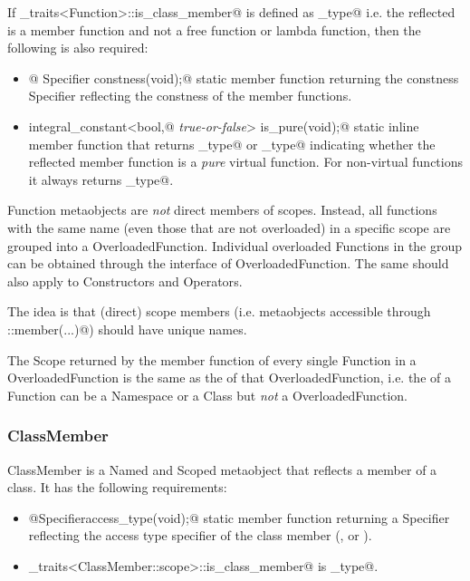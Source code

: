 If \verb@metaobject_traits<Function>::is_class_member@ is defined as \verb@true_type@
i.e. the reflected is a member function and not a free function or lambda function,
then the following is also required:

\begin{itemize}
	\item{\verb@static @ {\metaobject Specifier} \verb@ constness(void);@} static member function
	returning  the constness {\metaobject Specifier} reflecting the constness
	of the member functions.

	\item{\verb@static integral_constant<bool,@ {\em true-or-false}\verb@> is_pure(void);@}
	static inline member function that returns \verb@true_type@ or \verb@false_type@ indicating
	whether the reflected member function is a {\em pure} virtual function. For non-virtual
	functions it always returns \verb@false_type@.
\end{itemize}

{\metaobject Function} metaobjects are {\em not} direct members of scopes. Instead,
all functions with the same name (even those that are not overloaded) in a specific scope
are grouped into a {\metaobject OverloadedFunction}. Individual overloaded {\metaobject Function}s
in the group can be obtained through the interface of {\metaobject OverloadedFunction}.
The same should also apply to {\metaobject Constructor}s and {\metaobject Operator}s.

The idea is that (direct) scope members (i.e. metaobjects accessible through \verb@Scope::member(...)@)
should have unique names.

The {\metaobject Scope} returned by the \verb@scope@ member function of every single
{\metaobject Function} in a {\metaobject OverloadedFunction}
is the same as the \verb@scope@ of that {\metaobject OverloadedFunction}, i.e.
the \verb@scope@ of a {\metaobject Function} can be a {\metaobject Namespace} or a {\metaobject Class}
but {\em not} a {\metaobject OverloadedFunction}.

\subsubsection{ClassMember}

{\metaobject ClassMember} is a {\metaobject Named} and {\metaobject Scoped} metaobject
that reflects a member of a class. It has the following requirements:

\begin{itemize}
	\item{\verb@static @{\metaobject Specifier}\verb@ access_type(void);@} static member function returning
	a {\metaobject Specifier} reflecting the access type specifier of the class member
	(\verb@private@, \verb@protected@ or \verb@public@).

	\item \verb@metaobject_traits<ClassMember::scope>::is_class_member@ is \verb@true_type@.
\end{itemize}

